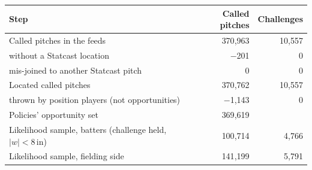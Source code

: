 \begin{tabular}{lrr}
\toprule
Step & Called pitches & Challenges \\
\midrule
Called pitches in the feeds & 370{,}963 & 10{,}557 \\
without a Statcast location & $-$201 & 0 \\
mis-joined to another Statcast pitch & 0 & 0 \\
Located called pitches & 370{,}762 & 10{,}557 \\
thrown by position players (not opportunities) & $-$1{,}143 & 0 \\
Policies' opportunity set & 369{,}619 &  \\
Likelihood sample, batters (challenge held, $|w|<8$\,in) & 100{,}714 & 4{,}766 \\
Likelihood sample, fielding side & 141{,}199 & 5{,}791 \\
\bottomrule
\end{tabular}
